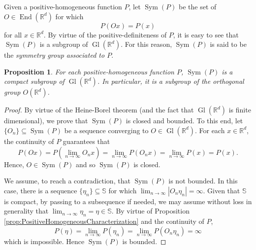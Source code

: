\documentclass[11pt]{article}
\newtheorem{proposition}[theorem]{Proposition}
\theoremstyle{remark}
\newcommand\End{\operatorname{End}} %
\newcommand\Gl{\operatorname{Gl}} %
\newcommand\Sym{\operatorname{Sym}}
\begin{document}
\noindent Given a positive-homogeneous function $P$, let $\Sym(P)$ be the set of $O\in\End(\mathbb{R}^d)$ for which
\begin{equation*}
P(Ox)=P(x)
\end{equation*}
for all $x\in\mathbb{R}^d$. By virtue of the positive-definiteness of $P$, it is easy to see that $\Sym(P)$ is a subgroup of $\Gl(\mathbb{R}^d)$. For this reason, $\Sym(P)$ is said to be the \textit{symmetry group associated to $P$}. 

\begin{proposition}\label{prop:SymCompact}
For each positive-homogeneous function $P$, $\Sym(P)$ is a compact subgroup of $\Gl(\mathbb{R}^d)$. In particular, it is a subgroup of the orthogonal group $O(\mathbb{R}^d)$.
\end{proposition}
\begin{proof}
By virtue of the Heine-Borel theorem (and the fact that $\Gl(\mathbb{R}^d)$ is finite dimensional), we prove that $\Sym(P)$ is closed and bounded. To this end, let $\{O_n\}\subseteq\Sym(P)$ be a sequence converging to $O\in \Gl(\mathbb{R}^d)$. For each $x\in\mathbb{R}^d$, the continuity of $P$ guarantees that
\begin{equation*}
P(Ox)=P\left(\lim_{n\to\infty}O_nx\right)=\lim_{n\to\infty}P(O_nx)=\lim_{n\to\infty}P(x)=P(x).
\end{equation*}
Hence, $O\in\Sym(P)$ and so $\Sym(P)$ is closed.

We assume, to reach a contradiction, that $\Sym(P)$ is not bounded. In this case, there is a sequence $\{\eta_n\}\subseteq \mathbb{S}$ for which $\lim_{n\to\infty}|O_n\eta_n|=\infty$. Given that $\mathbb{S}$ is compact, by passing to a subsequence if needed, we may assume without loss in generality that $\lim_{n\to\infty}\eta_n=\eta\in\mathbb{S}$. By virtue of Proposition \ref{prop:PositiveHomogeneousCharacterization} and the continuity of $P$,
\begin{equation*}
P(\eta)=\lim_{n\to\infty}P(\eta_n)=\lim_{n\to\infty}P(O_n\eta_n)=\infty
\end{equation*}
which is impossible. Hence $\Sym(P)$ is bounded.
\end{proof}
\end{document}
